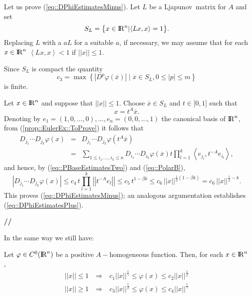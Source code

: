 \documentclass[12pt,a4paper]{amsart}
\begin{document}
{{\removelastskip\par\medskip\goodbreak{}}
Let us prove (\ref{eq::DPhiEstimatesMinus}).
Let ${L}$ be a {Ljapunov}\ matrix for ${A}$
and set
$$
	S_{L}=\bigl\{{x}\in{{\rm I\kern-.185em R}}^{n}\vert{\left<{{L}{x}},{{x}}\right>}=1\bigr\}.
$$
Replacing ${L}$ with a $a{L}$ for a suitable $a$,
if necessary,
we may assume that for each ${x}\in{{\rm I\kern-.185em R}}^{n}$
${\left<{{L}{x}},{{x}}\right>}<1$ if ${\left|\!\left|{x}\right|\!\right|}\leq1$.

Since $S_{L}$ is compact the quantity
$$
	{c}_3=\max\left\{
		{\left|{{D}^p{\varphi}({\overline{x}})}\right|}\mid{\overline{x}}\in S_{L},
		0\leq{\left|{p}\right|}\leq{m}
	\right\}
$$
is finite.

Let ${x}\in{{\rm I\kern-.185em R}}^{n}$ and suppose that ${\left|\!\left|{x}\right|\!\right|}\leq1$.
Choose ${\overline{x}}\in S_{L}$ and ${t}\in]0,1]$ such that
$$
	{x}={t}^{A}{\overline{x}}.
$$
Denoting by ${e}_1=(1,0,\ldots,0),\ldots,{e}_{n}=(0,0,\ldots,1)$
the canonical basis of ${{\rm I\kern-.185em R}}^{n}$,
from (\ref{prop::EulerEx::ToProve}) it follows that
\begin{eqnarray}
\nonumber
	{D}_{{j}_1}\cdots{D}_{{j}_{k}}{\varphi}({x})&=&
	{D}_{{j}_1}\cdots{D}_{{j}_{k}}{\varphi}({t}^{A}{\overline{x}})
\\
\nonumber
	&=&\sum_{1\leq{i}_1,\ldots,{i}_{k}\leq{n}}
	{D}_{{i}_1}\cdots{D}_{{i}_{k}}{\varphi}({\overline{x}}){t}
	\prod_{{l}=1}^{k}{\left<{{e}_{{j}_{l}}},{{t}^{-{A}}{e}_{{i}_{l}}}\right>},
\end{eqnarray}
and hence, by (\ref{eq::PBaseEstimatesTwo}) and (\ref{eq::PolarB}),
\begin{equation}
\nonumber
	{\left|{{D}_{{j}_1}\cdots{D}_{{j}_{k}}{\varphi}({x})}\right|}\leq
	{c}_4\,{t}\prod_{{l}=1}^{k}
	{\left|\!\left|{{t}^{-{A}}{e}_{l}}\right|\!\right|}\leq
	{c}_5\,{t}^{1-{\beta}{k}}\leq
	{c}_6\,{\left|\!\left|{x}\right|\!\right|}^{\frac{1}{\beta}(1-{\beta}{k})}=
	{c}_6\,{\left|\!\left|{x}\right|\!\right|}^{\frac{1}{\beta}-{k}}.
\end{equation}
This proves (\ref{eq::DPhiEstimatesMinus});
an analogous argumentation establishes
(\ref{eq::DPhiEstimatesPlus}).
{{\bf //}\par\smallskip}

In the same way we still have:

\begin{proposition}\label{prop::AHomoEstimates}
Let ${\varphi}\in C^0({{\rm I\kern-.185em R}}^{n})$ be a positive
${A}-$homogeneous function.
Then, for each ${x}\in{{\rm I\kern-.185em R}}^{n}$,
\begin{eqnarray}
{\left|\!\left|{x}\right|\!\right|}\leq1\ &\Longrightarrow&\ 
{c}_1{\left|\!\left|{x}\right|\!\right|}^{\frac{1}{\gamma}}
\leq{\varphi}({x})\leq
{c}_2{\left|\!\left|{x}\right|\!\right|}^{\frac{1}{\beta}}
\nonumber\\
{\left|\!\left|{x}\right|\!\right|}\geq1\ &\Longrightarrow&\ 
{c}_3{\left|\!\left|{x}\right|\!\right|}^{\frac{1}{\beta}}
\leq{\varphi}({x})\leq
{c}_4{\left|\!\left|{x}\right|\!\right|}^{\frac{1}{\gamma}}
\nonumber
\end{eqnarray}
\end{proposition}

}
\end{document}
